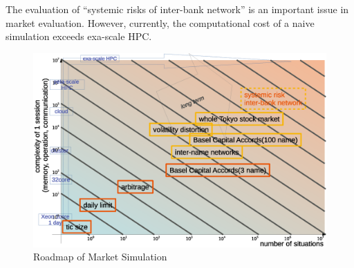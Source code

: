 The evaluation of ``systemic risks of inter-bank network'' is an important issue
in market evaluation.
However, currently, the 
computational cost of a naive simulation exceeds exa-scale HPC.


\begin{figure}
  \centering
  \includegraphics[width=.60\linewidth]{Figs.noda/figure2-6.eps}
  \caption{Roadmap of Market Simulation}
  \label{fig:Figure-6}
\end{figure}




